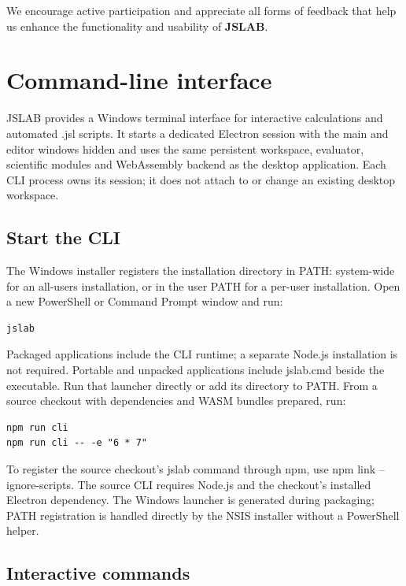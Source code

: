 \documentclass[12pt,a4paper]{article}
\begin{document}
We encourage active participation and appreciate all forms of feedback that help us enhance the functionality and usability of \textbf{JSLAB}.


\section{Command-line interface}

JSLAB provides a Windows terminal interface for interactive calculations and automated .jsl scripts. It starts a dedicated Electron session with the main and editor windows hidden and uses the same persistent workspace, evaluator, scientific modules and WebAssembly backend as the desktop application. Each CLI process owns its session; it does not attach to or change an existing desktop workspace.


\subsection{Start the CLI}

The Windows installer registers the installation directory in PATH: system-wide for an all-users installation, or in the user PATH for a per-user installation. Open a new PowerShell or Command Prompt window and run:

\begin{lstlisting}[style=JavaScriptStyle,language={}]
jslab
\end{lstlisting}

Packaged applications include the CLI runtime; a separate Node.js installation is not required. Portable and unpacked applications include jslab.cmd beside the executable. Run that launcher directly or add its directory to PATH. From a source checkout with dependencies and WASM bundles prepared, run:

\begin{lstlisting}[style=JavaScriptStyle,language={}]
npm run cli
npm run cli -- -e "6 * 7"
\end{lstlisting}

To register the source checkout's jslab command through npm, use npm link --ignore-scripts. The source CLI requires Node.js and the checkout's installed Electron dependency. The Windows launcher is generated during packaging; PATH registration is handled directly by the NSIS installer without a PowerShell helper.


\subsection{Interactive commands}
\end{document}
